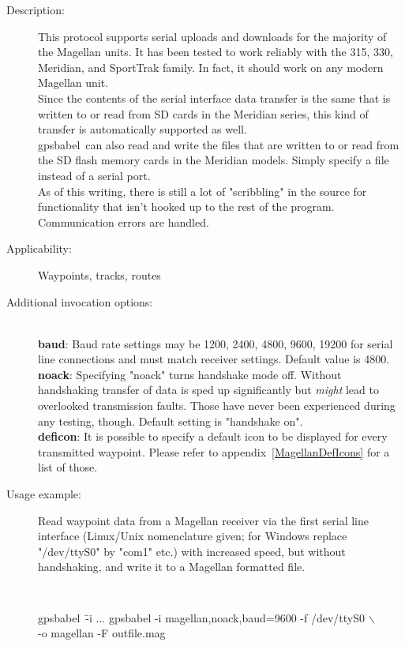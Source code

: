 \documentclass[12pt]{article}
\newcommand{\gpsbabel}{{\sc gpsbabel}}
\newcommand{\bsl}{$\backslash$}
\begin{document}
\begin{description}

\item[Description:] This protocol supports serial uploads and downloads for the majority of the Magellan units. It has been tested to work reliably with the 315, 330, Meridian, and SportTrak family. In fact, it should work on any modern Magellan unit.\\
Since the contents of the serial interface data transfer is the same that is written to or read from SD cards in the Meridian series, this kind of transfer is automatically supported as well.\\
\gpsbabel\ can also read and write the files that are written to or read from the SD flash memory cards in the Meridian models. Simply specify a file instead of a serial port.\\
%
{\small As of this writing, there is still a lot of "scribbling" in the 
source for functionality that isn't hooked up to the rest of the
program.    Communication errors are handled.}

\item[Applicability:] Waypoints, tracks, routes

\item[Additional invocation options:]~\\
{\bfseries baud}: Baud rate settings may be 1200, 2400, 4800, 9600, 19200 for serial line connections and must match receiver settings. Default value is 4800.\\
{\bfseries noack}: Specifying "noack" turns handshake mode off. Without handshaking transfer of data is sped up significantly but {\em might} lead to overlooked transmission faults. Those have never been experienced during any testing, though. Default setting is "handshake on".\\
{\bfseries deficon}: It is possible to specify a default icon to be displayed for every transmitted waypoint. Please refer to appendix~\ref{MagellanDefIcons} for a list of those.

\item[Usage example:] Read waypoint data from a Magellan receiver via the first serial line interface (Linux/Unix nomenclature given; for Windows replace "/dev/ttyS0" by "com1" etc.) with increased speed, but without handshaking, and write it to a Magellan formatted file.\\[-8mm]
{\tt \small
\begin{tabbing}
gpsbabel~\= -i ... \kill
gpsbabel \> -i magellan,noack,baud=9600 -f /dev/ttyS0 \bsl \+ \\
						-o magellan -F outfile.mag
\end{tabbing}
}

\end{description}
\end{document}
